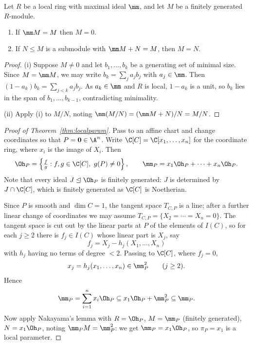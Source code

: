 \begin{lemma}[Nakayama]\label{lem:nakayama}
	Let $R$ be a local ring with maximal ideal $\mm$, and let $M$ be a finitely generated $R$-module.
	\begin{enumerate}[label=(\roman*)]
		\item If $\mm M = M$ then $M = 0$.
		\item If $N \leq M$ is a submodule with $\mm M + N = M$, then $M = N$.
	\end{enumerate}
\end{lemma}

\begin{proof}
	(i) Suppose $M \neq 0$ and let $b_1,\dots,b_k$ be a generating set of minimal size. Since $M = \mm M$, we may write $b_k = \sum_j a_j b_j$ with $a_j \in \mm$. Then $(1-a_k)b_k = \sum_{j<k} a_jb_j$. As $a_k \in \mm$ and $R$ is local, $1 - a_k$ is a unit, so $b_k$ lies in the span of $b_1,\dots,b_{k-1}$, contradicting minimality.

	(ii) Apply (i) to $M/N$, noting $\mm(M/N) = (\mm M + N)/N = M/N$.
\end{proof}

\begin{proof}[Proof of Theorem~\ref{thm:localparam}]
	Pass to an affine chart and change coordinates so that $P = \mathbf 0 \in \A^n$. Write $\C[C] = \C[x_1,\dots,x_n]$ for the coordinate ring, where $x_i$ is the image of $X_i$. Then
	$$\Oh_P = \left\{\tfrac fg : f,g \in \C[C],\ g(P) \neq 0\right\}, \qquad \mm_P = x_1\Oh_P + \cdots + x_n\Oh_P.$$
	Note that every ideal $J \trianglelefteq \Oh_P$ is finitely generated: $J$ is determined by $J \cap \C[C]$, which is finitely generated as $\C[C]$ is Noetherian.

	Since $P$ is smooth and $\dim C = 1$, the tangent space $T_{C,P}$ is a line; after a further linear change of coordinates we may assume $T_{C,P} = \{X_2 = \cdots = X_n = 0\}$. The tangent space is cut out by the linear parts at $P$ of the elements of $I(C)$, so for each $j \geq 2$ there is $f_j \in I(C)$ whose linear part is $X_j$, say
	$$f_j = X_j - h_j(X_1,\dots,X_n)$$
	with $h_j$ having no terms of degree $< 2$. Passing to $\C[C]$, where $f_j = 0$,
	$$x_j = h_j(x_1,\dots,x_n) \in \mm_P^2 \qquad (j \geq 2).$$
	Hence
	$$\mm_P = \sum_{i=1}^n x_i\Oh_P \subseteq x_1\Oh_P + \mm_P^2 \subseteq \mm_P.$$
	Now apply Nakayama's lemma with $R = \Oh_P$, $M = \mm_P$ (finitely generated), $N = x_1\Oh_P$, noting $\mm_P M = \mm_P^2$: we get $\mm_P = x_1\Oh_P$, so $\pi_P = x_1$ is a local parameter.
\end{proof}

